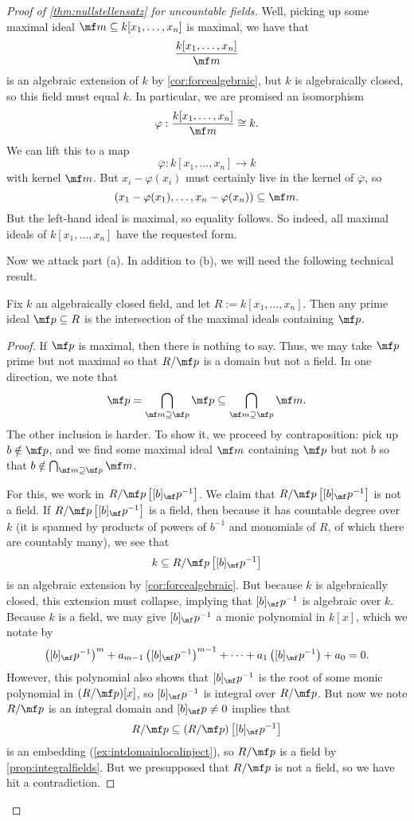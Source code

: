 \begin{proof}[Proof of \autoref{thm:nullstellensatz} for uncountable fields]
	Well, picking up some maximal ideal $\mf m\subseteq k[x_1,\ldots,x_n]$ is maximal, we have that
	\[\frac{k[x_1,\ldots,x_n]}{\mf m}\]
	is an algebraic extension of $k$ by \autoref{cor:forcealgebraic}, but $k$ is algebraically closed, so this field must equal $k$. In particular, we are promised an isomorphism
	\[\varphi:\frac{k[x_1,\ldots,x_n]}{\mf m}\cong k.\]
	We can lift this to a map
	\[\overline\varphi:k[x_1,\ldots,x_n]\to k\]
	with kernel $\mf m$. But $x_i-\varphi(x_i)$ must certainly live in the kernel of $\overline\varphi$, so
	\[(x_1-\varphi(x_1),\ldots,x_n-\varphi(x_n))\subseteq\mf m.\]
	But the left-hand ideal is maximal, so equality follows. So indeed, all maximal ideals of $k[x_1,\ldots,x_n]$ have the requested form.

	Now we attack part (a). In addition to (b), we will need the following technical result.
	\begin{lemma} \label{lem:betterjacobson}
		Fix $k$ an algebraically closed field, and let $R:=k[x_1,\ldots,x_n]$. Then any prime ideal $\mf p\subseteq R$ is the intersection of the maximal ideals containing $\mf p$.
	\end{lemma}
	\begin{proof}
		If $\mf p$ is maximal, then there is nothing to say. Thus, we may take $\mf p$ prime but not maximal so that $R/\mf p$ is a domain but not a field. In one direction, we note that
		\[\mf p=\bigcap_{\mf m\supseteq\mf p}\mf p\subseteq\bigcap_{\mf m\supseteq\mf p}\mf m.\]
		The other inclusion is harder. To show it, we proceed by contraposition: pick up $b\notin\mf p$, and we find some maximal ideal $\mf m$ containing $\mf p$ but not $b$ so that $b\notin\bigcap_{\mf m\supseteq\mf p}\mf m$.

		For this, we work in $R/\mf p\left[[b]_\mf p^{-1}\right]$. We claim that $R/\mf p\left[[b]_\mf p^{-1}\right]$ is not a field. If $R/\mf p\left[[b]_\mf p^{-1}\right]$ is a field, then because it has countable degree over $k$ (it is spanned by products of powers of $b^{-1}$ and monomials of $R$, of which there are countably many), we see that
		\[k\subseteq R/\mf p\left[[b]_\mf p^{-1}\right]\]
		is an algebraic extension by \autoref{cor:forcealgebraic}. But because $k$ is algebraically closed, this extension must collapse, implying that $[b]_\mf p^{-1}$ is algebraic over $k$. Because $k$ is a field, we may give $[b]_\mf p^{-1}$ a monic polynomial in $k[x]$, which we notate by
		\[\left([b]_\mf p^{-1}\right)^m+a_{m-1}\left([b]_\mf p^{-1}\right)^{m-1}+\cdots+a_1\left([b]_\mf p^{-1}\right)+a_0=0.\]
		However, this polynomial also shows that $[b]_\mf p^{-1}$ is the root of some monic polynomial in $(R/\mf p)[x]$, so $[b]_\mf p^{-1}$ is integral over $R/\mf p$. But now we note $R/\mf p$ is an integral domain and $[b]_\mf p\ne0$ implies that
		\[R/\mf p\subseteq(R/\mf p)\left[[b]_\mf p^{-1}\right]\]
		is an embedding (\autoref{ex:intdomainlocalinject}), so $R/\mf p$ is a field by \autoref{prop:integralfields}. But we presupposed that $R/\mf p$ is not a field, so we have hit a contradiction.


\end{proof}
\end{proof}
